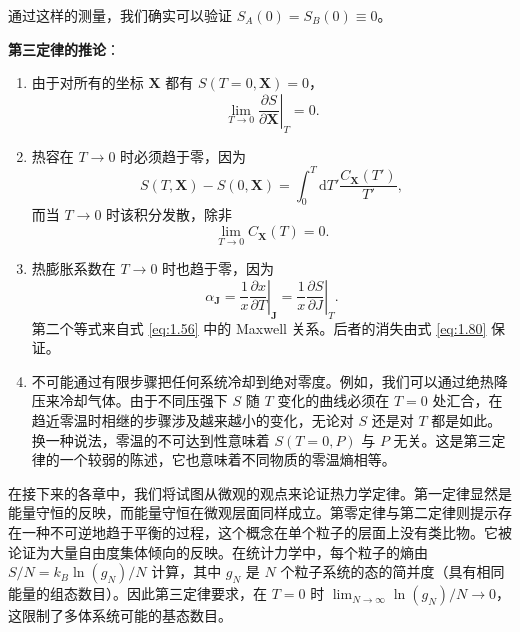 通过这样的测量，我们确实可以验证 $S_A(0)=S_B(0)\equiv0$。


\textbf{第三定律的推论}：

\begin{enumerate}[leftmargin=2.2em, itemsep=0.4em]
  \item 由于对所有的坐标 $\bm{X}$ 都有 $S(T=0,\bm{X})=0$，
\begin{equation}
\lim_{T\to0}\left.\frac{\partial S}{\partial\bm{X}}\right|_T=0.
\label{eq:1.80}
\end{equation}

  \item 热容在 $T\to0$ 时必须趋于零，因为
\begin{equation}
S(T,\bm{X})-S(0,\bm{X})=\int_0^T\mathrm{d}T'\frac{C_{\bm{X}}(T')}{T'},
\label{eq:1.81}
\end{equation}
而当 $T\to0$ 时该积分发散，除非
\begin{equation}
\lim_{T\to0}C_{\bm{X}}(T)=0.
\label{eq:1.82}
\end{equation}

  \item 热膨胀系数在 $T\to0$ 时也趋于零，因为
\begin{equation}
\alpha_{\bm{J}}=\left.\frac{1}{x}\frac{\partial x}{\partial T}\right|_{\bm{J}}=\left.\frac{1}{x}\frac{\partial S}{\partial J}\right|_T.
\label{eq:1.83}
\end{equation}
第二个等式来自式 \eqref{eq:1.56} 中的 Maxwell 关系。后者的消失由式 \eqref{eq:1.80} 保证。

  \item 不可能通过有限步骤把任何系统冷却到绝对零度。例如，我们可以通过绝热降压来冷却气体。由于不同压强下 $S$ 随 $T$ 变化的曲线必须在 $T=0$ 处汇合，在趋近零温时相继的步骤涉及越来越小的变化，无论对 $S$ 还是对 $T$ 都是如此。换一种说法，零温的不可达到性意味着 $S(T=0,P)$ 与 $P$ 无关。这是第三定律的一个较弱的陈述，它也意味着不同物质的零温熵相等。
\end{enumerate}


在接下来的各章中，我们将试图从微观的观点来论证热力学定律。第一定律显然是能量守恒的反映，而能量守恒在微观层面同样成立。第零定律与第二定律则提示存在一种不可逆地趋于平衡的过程，这个概念在单个粒子的层面上没有类比物。它被论证为大量自由度集体倾向的反映。在统计力学中，每个粒子的熵由 $S/N=k_B\ln(g_N)/N$ 计算，其中 $g_N$ 是 $N$ 个粒子系统的态的简并度（具有相同能量的组态数目）。因此第三定律要求，在 $T=0$ 时 $\lim_{N\to\infty}\ln(g_N)/N\to0$，这限制了多体系统可能的基态数目。

